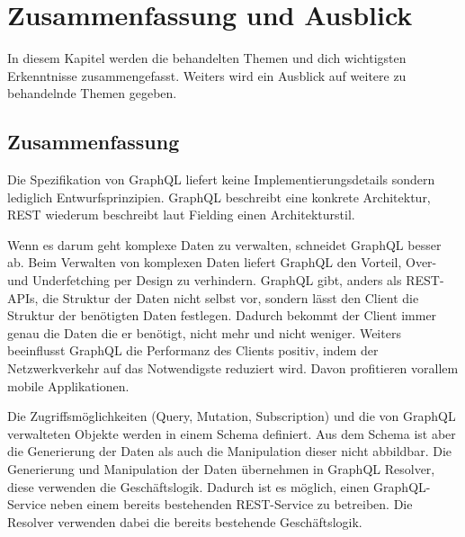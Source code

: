 \chapter{Zusammenfassung und Ausblick}
In diesem Kapitel werden die behandelten Themen und dich wichtigsten Erkenntnisse zusammengefasst.
Weiters wird ein Ausblick auf weitere zu behandelnde Themen gegeben.

\section{Zusammenfassung}
Die Spezifikation von GraphQL liefert keine Implementierungsdetails sondern lediglich Entwurfsprinzipien.
GraphQL beschreibt eine konkrete Architektur, REST wiederum beschreibt laut Fielding einen Architekturstil.
\newline

Wenn es darum geht komplexe Daten zu verwalten, schneidet GraphQL besser ab.
Beim Verwalten von komplexen Daten liefert GraphQL den Vorteil, Over- und Underfetching per Design zu verhindern.
GraphQL gibt, anders als REST-APIs, die Struktur der Daten nicht selbst vor, sondern lässt den Client die Struktur der benötigten Daten festlegen. 
Dadurch bekommt der Client immer genau die Daten die er benötigt, nicht mehr und nicht weniger.
Weiters beeinflusst GraphQL die Performanz des Clients positiv, indem der Netzwerkverkehr auf das Notwendigste reduziert wird.
Davon profitieren vorallem mobile Applikationen.
\newline

Die Zugriffsmöglichkeiten (Query, Mutation, Subscription) und die von GraphQL verwalteten Objekte werden in einem Schema definiert.
Aus dem Schema ist aber die Generierung der Daten als auch die Manipulation dieser nicht abbildbar.
Die Generierung und Manipulation der Daten übernehmen in GraphQL Resolver, diese verwenden die Geschäftslogik.
Dadurch ist es möglich, einen GraphQL-Service neben einem bereits bestehenden REST-Service zu betreiben.
Die Resolver verwenden dabei die bereits bestehende Geschäftslogik.
\newline

